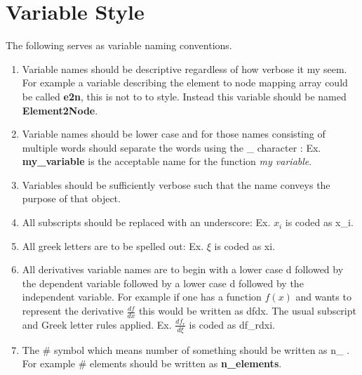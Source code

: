 \documentclass[letterpaper]{article}
\begin{document}
\section{Variable Style}
The following serves as variable naming conventions.  
\begin{enumerate}
\item Variable names should be descriptive regardless of how verbose it my seem.  For example a variable describing the element to node mapping array could be called \textbf{e2n}, this is not to to style.  Instead this variable should be named \textbf{Element2Node}.  
\item Variable names should be lower case and for those names consisting of multiple words should separate the words using the \_ character  : Ex. \textbf{my\_variable} is the acceptable name for the function \textit{my variable}.  
\item Variables should be sufficiently verbose such that the name conveys the purpose of that object.  
\item All subscripts should be replaced with an underscore: Ex. $x_{i}$ is coded as x\_i.  
\item All greek letters are to be spelled out: Ex. $\xi$ is coded as xi.
\item All derivatives variable names are to begin with a lower case d followed by the dependent variable followed by a lower case d followed by the independent variable.  For example if one has a function $f(x)$ and wants to represent the derivative $\frac{d f}{dx}$ this would be written as dfdx.  The usual subscript and Greek letter rules applied.  Ex. $\frac{d f_{r}}{d\xi}$ is coded as df\_rdxi.  
\item The \# symbol which means number of something should be written as n\_ .  For example \# elements should be written as \textbf{n\_elements}. 
\end{enumerate}
\end{document}

